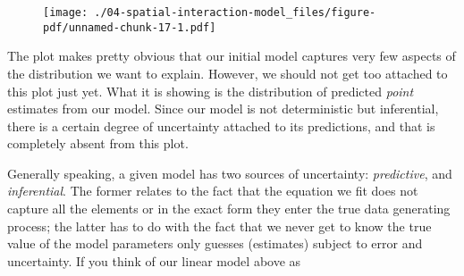 \documentclass[
  letterpaper,
  krantz2]{style/krantz}
\newenvironment{Shaded}{\begin{snugshade}}{\end{snugshade}}
\newcommand{\AttributeTok}[1]{\textcolor[rgb]{0.40,0.45,0.13}{#1}}
\newcommand{\DecValTok}[1]{\textcolor[rgb]{0.68,0.00,0.00}{#1}}
\newcommand{\FunctionTok}[1]{\textcolor[rgb]{0.28,0.35,0.67}{#1}}
\newcommand{\NormalTok}[1]{\textcolor[rgb]{0.00,0.23,0.31}{#1}}
\newcommand{\SpecialCharTok}[1]{\textcolor[rgb]{0.37,0.37,0.37}{#1}}
\newcommand{\StringTok}[1]{\textcolor[rgb]{0.13,0.47,0.30}{#1}}
\begin{document}
\begin{Shaded}
\end{Shaded}

\begin{figure}[H]

{\centering \texttt{[image: ./04-spatial-interaction-model\_files/figure-pdf/unnamed-chunk-17-1.pdf]}

}

\end{figure}

The plot makes pretty obvious that our initial model captures very few
aspects of the distribution we want to explain. However, we should not
get too attached to this plot just yet. What it is showing is the
distribution of predicted \emph{point} estimates from our model. Since
our model is not deterministic but inferential, there is a certain
degree of uncertainty attached to its predictions, and that is
completely absent from this plot.

Generally speaking, a given model has two sources of uncertainty:
\emph{predictive}, and \emph{inferential}. The former relates to the
fact that the equation we fit does not capture all the elements or in
the exact form they enter the true data generating process; the latter
has to do with the fact that we never get to know the true value of the
model parameters only guesses (estimates) subject to error and
uncertainty. If you think of our linear model above as
\end{document}
